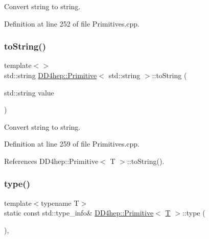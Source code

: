 Convert string to string. 



Definition at line 252 of file Primitives.\+cpp.

\hypertarget{struct_d_d4hep_1_1_primitive_ab13273b17c6e2cb1a330d23ad8a891db}{}\label{struct_d_d4hep_1_1_primitive_ab13273b17c6e2cb1a330d23ad8a891db} 
\subsubsection{\texorpdfstring{to\+String()}{toString()}\hspace{0.1cm}{\footnotesize\ttfamily [4/4]}}
{\footnotesize\ttfamily template$<$$>$ \\
std\+::string \hyperlink{struct_d_d4hep_1_1_primitive}{D\+D4hep\+::\+Primitive}$<$ std\+::string $>$\+::to\+String (\begin{DoxyParamCaption}\item[{std\+::string}]{value }\end{DoxyParamCaption})}



Convert string to string. 



Definition at line 259 of file Primitives.\+cpp.



References D\+D4hep\+::\+Primitive$<$ T $>$\+::to\+String().

\hypertarget{struct_d_d4hep_1_1_primitive_afd4ccf13e6eaa9bdecdf053a0b0dee50}{}\label{struct_d_d4hep_1_1_primitive_afd4ccf13e6eaa9bdecdf053a0b0dee50} 
\subsubsection{\texorpdfstring{type()}{type()}}
{\footnotesize\ttfamily template$<$typename T$>$ \\
static const std\+::type\+\_\+info\& \hyperlink{struct_d_d4hep_1_1_primitive}{D\+D4hep\+::\+Primitive}$<$ \hyperlink{class_t}{T} $>$\+::type (\begin{DoxyParamCaption}{ }\end{DoxyParamCaption})\hspace{0.3cm}{\ttfamily [inline]}, {\ttfamily [static]}}



